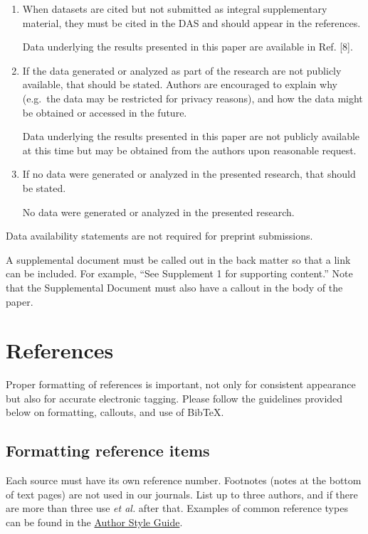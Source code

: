 \documentclass{optica-article}
\begin{document}
\begin{backmatter}
\begin{enumerate}
\item When datasets are cited but not submitted as integral supplementary material, they must be cited in the DAS and should appear in the references.

 Data underlying the results presented in this paper are available in Ref. [8].

\bigskip

\item If the data generated or analyzed as part of the research are not publicly available, that should be stated. Authors are encouraged to explain why (e.g.~the data may be restricted for privacy reasons), and how the data might be obtained or accessed in the future.

 Data underlying the results presented in this paper are not publicly available at this time but may be obtained from the authors upon reasonable request.

\bigskip

\item If no data were generated or analyzed in the presented research, that should be stated.

 No data were generated or analyzed in the presented research.
\end{enumerate}

\bigskip

\noindent Data availability statements are not required for preprint submissions.

A supplemental document must be called out in the back matter so that a link can be included. For example, “See Supplement 1 for supporting content.” Note that the Supplemental Document must also have a callout in the body of the paper.

\end{backmatter}

\section{References}
\label{sec:refs}
Proper formatting of references is important, not only for consistent appearance but also for accurate electronic tagging. Please follow the guidelines provided below on formatting, callouts, and use of Bib\TeX.

\subsection{Formatting reference items}
Each source must have its own reference number. Footnotes (notes at the bottom of text pages) are not used in our journals. List up to three authors, and if there are more than three use \emph{et al.} after that. Examples of common reference types can be found in the  \href{https://opg.optica.org/jot/submit/style/oestyleguide.cfm} {Author Style Guide}.
\end{document}
